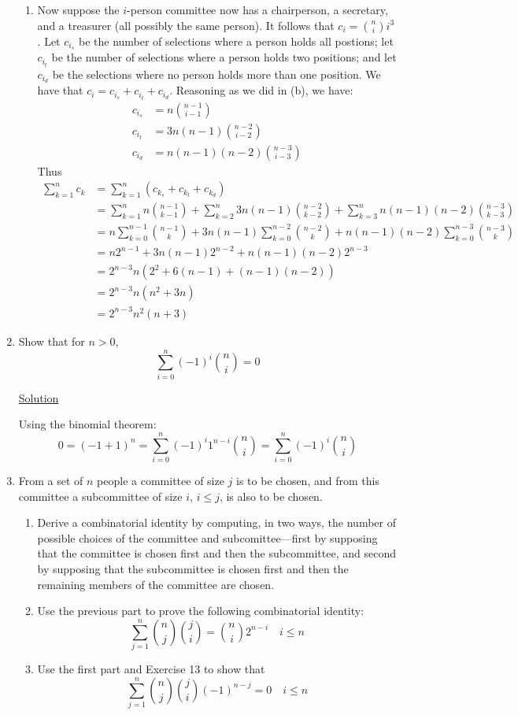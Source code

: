 \begin{enumerate}
\begin{enumerate}
\item Now suppose the $i$-person committee now has a chairperson, a secretary,
and a treasurer (all possibly the same person). It follows that
$c_i = \binom{n}{i}i^3$. Let $c_{i_s}$ be the number of selections where a 
person holds all postions; let $c_{i_t}$ be the number of selections where a
person holds two positions; and let $c_{i_d}$ be the selections where no person
holds more than one position. We have that
$c_i = c_{i_s} + c_{i_t} + c_{i_d}$. Reasoning as we did in (b), we have:
\begin{align*}
c_{i_s} &= n\binom{n-1}{i-1} \\
c_{i_t} &= 3n(n-1)\binom{n-2}{i-2} \\
c_{i_d} &= n(n-1)(n-2)\binom{n-3}{i-3}
\end{align*}
Thus
\begin{align*}
\sum_{k=1}^nc_k &= \sum_{k=1}^n(c_{k_s} + c_{k_t} + c_{k_d}) \\ 
&= \sum_{k=1}^nn\binom{n-1}{k-1} + \sum_{k=2}^n3n(n-1)\binom{n-2}{k-2} + 
\sum_{k=3}^nn(n-1)(n-2)\binom{n-3}{k-3} \\
&= n\sum_{k=0}^{n-1}\binom{n-1}{k} + 3n(n-1)\sum_{k=0}^{n-2}\binom{n-2}{k} + 
n(n-1)(n-2)\sum_{k=0}^{n-3}\binom{n-3}{k}\\
&= n2^{n-1} + 3n(n-1)2^{n-2} + n(n-1)(n-2)2^{n-3} \\
&= 2^{n-3}n(2^2 + 6(n-1) + (n-1)(n-2)) \\
&= 2^{n-3}n(n^2 + 3n) \\
&= 2^{n-3}n^2(n + 3)
\end{align*}
\end{enumerate}

\item Show that for $n > 0$,
\[\sum_{i=0}^n(-1)^i\binom{n}{i} = 0\]

\underline{Solution}

Using the binomial theorem:
\[0 = (-1+1)^n = \sum_{i=0}^n(-1)^i1^{n-i}\binom{n}{i} =
\sum_{i=0}^n(-1)^i\binom{n}{i}\]

\item From a set of $n$ people a committee of size $j$ is to be chosen, and from
this committee a subcommittee of size $i$, $i \le j$, is also to be chosen.
\begin{enumerate}
\item Derive a combinatorial identity by computing, in two ways, the number of 
possible choices of the committee and subcomittee---first by supposing that the
committee is chosen first and then the subcommittee, and second by supposing
that the subcommittee is chosen first and then the remaining members of the
committee are chosen.
\item Use the previous part to prove the following combinatorial identity:
\[\sum_{j=1}^n\binom{n}{j}\binom{j}{i} = \binom{n}{i}2^{n-i} \quad i \le n\]
\item Use the first part and Exercise 13 to show that
\[\sum_{j=1}^n\binom{n}{j}\binom{j}{i}(-1)^{n-j} = 0 \quad i \le n\]
\end{enumerate}


\end{enumerate}
